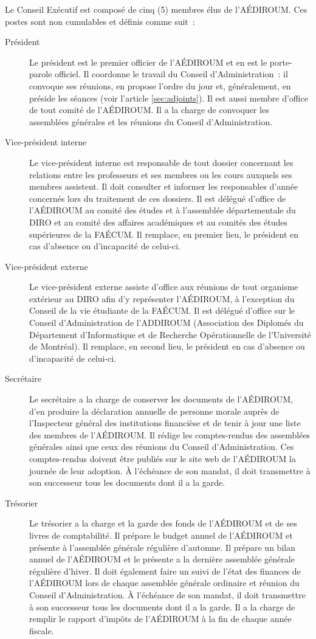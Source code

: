 \documentclass{aediroum}
\newcommand{\article}[1]{article \ref{#1}}
\begin{document}
Le Conseil Exécutif est composé de cinq (5) membres élus de l'AÉDIROUM. Ces postes sont non cumulables et définis comme suit~:
\begin{description}
\item[Président] Le président est le premier officier de l'AÉDIROUM et en est le porte-parole officiel. Il coordonne le travail du Conseil d'Administration~: il convoque ses réunions, en propose l'ordre du jour et, généralement, en préside les séances (voir l'\article{sec:adjoints}). Il est aussi membre d'office de tout comité de l'AÉDIROUM. Il a la charge de convoquer les assemblées générales et les réunions du Conseil d'Administration.
\item[Vice-président interne] Le vice-président interne est responsable de tout dossier concernant les relations entre les professeurs et ses membres ou les cours auxquels ses membres assistent. Il doit consulter et informer les responsables d'année concernés lors du traitement de ces dossiers. Il est délégué d'office de l'AÉDIROUM au comité des études et à l'assemblée départementale du DIRO et au comité des affaires académiques et au comités des études supérieures de la FAÉCUM. Il remplace, en premier lieu, le président en cas d'absence ou d'incapacité de celui-ci.
\item[Vice-président externe] Le vice-président externe assiste d'office aux réunions de tout organisme extérieur au DIRO afin d'y représenter l'AÉDIROUM, à l'exception du Conseil de la vie étudiante de la FAÉCUM. Il est délégué d'office sur le Conseil d'Administration de l'ADDIROUM (Association des Diplomés du Département d'Informatique et de Recherche Opérationnelle de l'Université de Montréal). Il remplace, en second lieu, le président en cas d'absence ou d'incapacité de celui-ci.
\item[Secrétaire] Le secrétaire a la charge de conserver les documents de l'AÉDIROUM, d'en produire la déclaration annuelle de personne morale auprès de l'Inspecteur général des institutions financièse et de tenir à jour une liste des membres de l'AÉDIROUM. Il rédige les comptes-rendus des assemblées générales ainsi que ceux des réunions du Conseil d'Administration. Ces comptes-rendus doivent être publiés sur le site web de l'AÉDIROUM la journée de leur adoption. À l'échéance de son mandat, il doit transmettre à son successeur tous les documents dont il a la garde.
\item[Trésorier] Le trésorier a la charge et la garde des fonds de l'AÉDIROUM et de ses livres de comptabilité. Il prépare le budget annuel de l'AÉDIROUM et présente à l'assemblée générale régulière d'automne. Il prépare un bilan annuel de l'AÉDIROUM et le présente a la dernière assemblée générale régulière d'hiver. Il doit également faire un suivi de l'état des finances de l'AÉDIROUM lors de chaque assemblée générale ordinaire et réunion du Conseil d'Administration. À l'échéance de son mandat, il doit transmettre à son successeur tous les documents dont il a la garde. Il a la charge de remplir le rapport d'impôts de l'AÉDIROUM à la fin de chaque année fiscale.
\end{description}
\end{document}
